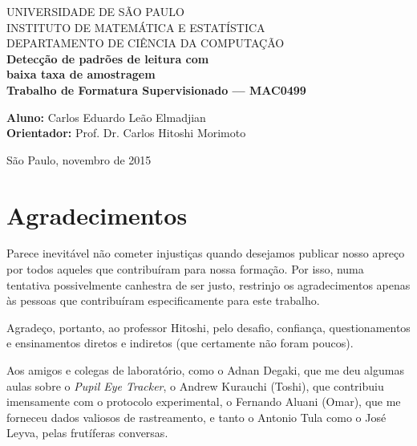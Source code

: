 \documentclass[12pt]{article}
\newcommand{\vsp}{\vspace{0.2in}}
\newcommand{\aluno}{{Carlos Eduardo Leão Elmadjian}}
\begin{document}
	
	\clearpage
	\thispagestyle{empty}
	
	\begin{minipage}[t]{6in}
		\begin{center}
			UNIVERSIDADE DE SÃO PAULO \\
			INSTITUTO DE MATEMÁTICA E ESTATÍSTICA\\
			DEPARTAMENTO DE CIÊNCIA DA COMPUTAÇÃO\\
			\vspace{5em}
			{\huge \textbf{Detecção de padrões de leitura com\\ baixa taxa de amostragem}}\\
			\vspace{2em}
			{\large \textbf{Trabalho de Formatura Supervisionado --- MAC0499}}\\
			\vspace{2em} 

		
			\vspace{8em}
			{\large \textbf{Aluno:} \aluno{}\\ }
			{\large \textbf{Orientador:} Prof. Dr. Carlos Hitoshi Morimoto\\}
			
			\vspace{5cm}
			\large{São Paulo, novembro de 2015}
		\end{center}
		
		
	\end{minipage}
	
	\vspace{150pt}
	
	
	\newpage
	
	\vsp
	
	
	\section*{Agradecimentos}
	Parece inevitável não cometer injustiças quando desejamos publicar nosso apreço por todos aqueles que contribuíram para nossa formação. Por isso, numa tentativa possivelmente canhestra de ser justo, restrinjo os agradecimentos apenas às pessoas que contribuíram especificamente para este trabalho.
	
	Agradeço, portanto, ao professor Hitoshi, pelo desafio, confiança, questionamentos e ensinamentos diretos e indiretos (que certamente não foram poucos).
	
	Aos amigos e colegas de laboratório, como o Adnan Degaki, que me deu algumas aulas sobre o \textit{Pupil Eye Tracker}, o Andrew Kurauchi (Toshi), que contribuiu imensamente com o protocolo experimental, o Fernando Aluani (Omar), que me forneceu dados valiosos de rastreamento, e tanto o Antonio Tula como o José Leyva, pelas frutíferas conversas.
	
\end{document}
